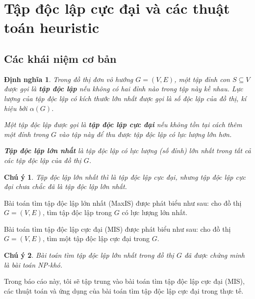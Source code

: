 \documentclass[14pt, oneside, a4paper, openany]{scrartcl}
\newtheorem*{remark}{Chú ý}
\newtheorem{definition}{Định nghĩa}[section]
\begin{document}
\newpage
{}
\section{Tập độc lập cực đại và các thuật toán heuristic}
\subsection{Các khái niệm cơ bản}
\begin{definition}
\cite{graphtextbook} Trong đồ thị đơn vô hướng $G = (V,E)$, một tập đỉnh con $S \subseteq V$ được gọi là \textbf{tập độc lập}  nếu không có hai đỉnh nào trong tập này kề nhau. Lực lượng của tập độc lập có kích thước lớn nhất được gọi là số độc lập của đồ thị, kí hiệu bởi $\alpha(G)$.	

Một tập độc lập được gọi là \textbf{tập độc lập cực đại}  nếu không tồn tại cách thêm một đỉnh trong $G$ vào tập này để thu được tập độc lập có lực lượng lớn hơn.

\textbf{Tập độc lập lớn nhất}  là tập độc lập có lực lượng (số đỉnh) lớn nhất trong tất cả các tập độc lập của đồ thị $G$.

\end{definition}
\begin{remark}
Tập độc lập lớn nhất thì là tập độc lập cực đại, nhưng tập độc lập cực đại chưa chắc đã là tập độc lập lớn nhất.	
\end{remark}

Bài toán tìm tập độc lập lớn nhất  (MaxIS) được phát biểu như sau: cho đồ thị $G = (V,E)$, tìm tập độc lập trong $G$ có lực lượng lớn nhất.

Bài toán tìm tập độc lập cực đại  (MIS) được phát biểu như sau: cho đồ thị $G = (V,E)$, tìm một tập độc lập cực đại trong $G$.


\begin{remark}
\cite{yannakakis01} Bài toán tìm tập độc lập lớn nhất trong đồ thị $G$ đã được chứng minh là bài toán NP-khó.
\end{remark}

Trong báo cáo này, tôi sẽ tập trung vào bài toán tìm tập độc lập cực đại (MIS), các thuật toán và ứng dụng của bài toán tìm tập độc lập cực đại trong thực tế. 
\end{document}
